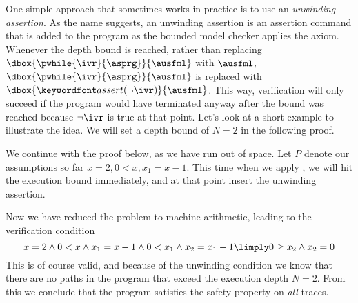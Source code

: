 \documentclass[11pt,twoside]{scrartcl}
\begin{document}
One simple approach that sometimes works in practice is to use an \emph{unwinding assertion}. As the name suggests, an unwinding assertion is an assertion command that is added to the program as the bounded model checker applies the  axiom. Whenever the depth bound is reached, rather than replacing $\dbox{\pwhile{\ivr}{\asprg}}{\ausfml}$ with $\ausfml$, $\dbox{\pwhile{\ivr}{\asprg}}{\ausfml}$ is replaced with $\dbox{\passert{\lnot\ivr}}{\ausfml}$. This way, verification will only succeed if the program would have terminated anyway after the bound was reached because $\lnot\ivr$ is true at that point. Let's look at a short example to illustrate the idea. We will set a depth bound of $N=2$ in the following proof.
\begin{sequentdeduction}
 {
}
\end{sequentdeduction}
We continue with the proof below, as we have run out of space. Let $P$ denote our assumptions so far $x=2,0<x,x_1=x-1$. This time when we apply , we will hit the execution bound immediately, and at that point insert the unwinding assertion.
\begin{sequentdeduction}
 {
}
\end{sequentdeduction}
Now we have reduced the problem to machine arithmetic, leading to the verification condition
\begin{equation}
x=2 \land 0<x \land x_1 = x-1 \land 0<x_1 \land x_2=x_1-1 \limply 0\ge x_2 \land x_2=0
\end{equation}
This is of course valid, and because of the unwinding condition we know that there are no paths in the program that exceed the execution depth $N=2$. From this we conclude that the program satisfies the safety property on \emph{all} traces.
\end{document}
